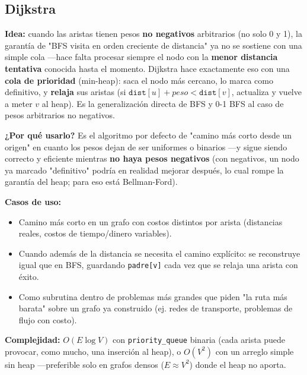 \documentclass[10pt,a4paper,twocolumn]{article}
\begin{document}
\subsection{Dijkstra}

\textbf{Idea:} cuando las aristas tienen pesos \textbf{no negativos}
arbitrarios (no solo 0 y 1), la garantía de "BFS visita en orden
creciente de distancia" ya no se sostiene con una simple cola —hace
falta procesar siempre el nodo con la \textbf{menor distancia
	tentativa} conocida hasta el momento. Dijkstra hace exactamente eso
con una \textbf{cola de prioridad} (min-heap): saca el nodo más
cercano, lo marca como definitivo, y \textbf{relaja} sus aristas
(si $\texttt{dist}[u] + peso < \texttt{dist}[v]$, actualiza y vuelve a
meter $v$ al heap). Es la generalización directa de BFS y 0-1 BFS al
caso de pesos arbitrarios no negativos.

\textbf{¿Por qué usarlo?} Es el algoritmo por defecto de "camino más
corto desde un origen" en cuanto los pesos dejan de ser uniformes o
binarios —y sigue siendo correcto y eficiente mientras \textbf{no
	haya pesos negativos} (con negativos, un nodo ya marcado "definitivo"
podría en realidad mejorar después, lo cual rompe la garantía del
heap; para eso está Bellman-Ford).

\textbf{Casos de uso:}

\begin{itemize}
	\item Camino más corto en un grafo con costos distintos por
	arista (distancias reales, costos de tiempo/dinero variables).
	\item Cuando además de la distancia se necesita el camino
	explícito: se reconstruye igual que en BFS, guardando
	\texttt{padre[v]} cada vez que se relaja una arista con éxito.
	\item Como subrutina dentro de problemas más grandes que piden
	"la ruta más barata" sobre un grafo ya construido (ej. redes de
	transporte, problemas de flujo con costo).
\end{itemize}

\textbf{Complejidad:} $O(E \log V)$ con \texttt{priority\_queue}
binaria (cada arista puede provocar, como mucho, una inserción al
heap), o $O(V^2)$ con un arreglo simple sin heap —preferible solo en
grafos densos ($E \approx V^2$) donde el heap no aporta.
\end{document}
